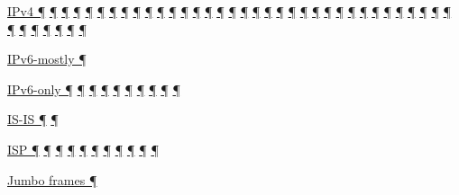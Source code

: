 \documentclass[
]{article}
\begin{document}
\hyperref[how-a-network-operations-center-sees-ipv6]{IPv4 ¶}
\hyperref[how-an-application-programmer-sees-ipv6]{¶}
\hyperref[why-ipv6-is-so-complicated]{¶} \hyperref[why-version-6]{¶}
\hyperref[address-resolution]{¶} \hyperref[addresses]{¶}
\hyperref[dns]{¶} \hyperref[extension-headers-and-options]{¶}
\hyperref[layer-2-functions]{¶} \hyperref[managed-configuration]{¶}
\hyperref[routing]{¶}
\hyperref[source-and-destination-address-selection]{¶}
\hyperref[traffic-class-and-flow-label]{¶}
\hyperref[transport-protocols]{¶}
\hyperref[coexistence-with-legacy-ipv4]{¶}
\hyperref[dual-stack-scenarios]{¶}
\hyperref[ipv6-primary-differences-from-ipv4]{¶}
\hyperref[obsolete-techniques]{¶}
\hyperref[translation-and-ipv4-as-a-service]{¶} \hyperref[tunnels]{¶}
\hyperref[security]{¶} \hyperref[filtering]{¶}
\hyperref[layer-2-considerations]{¶} \hyperref[topology-obfuscation]{¶}
\hyperref[network-design]{¶} \hyperref[address-planning]{¶}
\hyperref[address-and-prefix-management]{¶}
\hyperref[benchmarking-and-monitoring]{¶}
\hyperref[energy-consumption]{¶} \hyperref[multi-prefix-operation]{¶}
\hyperref[multihoming]{¶} \hyperref[packet-size-and-jumbo-frames]{¶}
\hyperref[routing-operation]{¶} \hyperref[cern-and-the-lhc]{¶}
\hyperref[deployment-by-carriers]{¶}
\hyperref[deployment-in-the-home]{¶} \hyperref[status]{¶}
\hyperref[troubleshooting]{¶} \hyperref[advanced-troubleshooting]{¶}
\hyperref[tools]{¶} \hyperref[obsolete-features-in-ipv6]{¶}
\hyperref[further-reading]{¶}

\hyperref[dual-stack-scenarios]{IPv6-mostly ¶}

\hyperref[routing]{IPv6-only ¶}
\hyperref[source-and-destination-address-selection]{¶}
\hyperref[coexistence-with-legacy-ipv4]{¶}
\hyperref[dual-stack-scenarios]{¶}
\hyperref[translation-and-ipv4-as-a-service]{¶} \hyperref[tunnels]{¶}
\hyperref[security]{¶} \hyperref[cern-and-the-lhc]{¶}
\hyperref[deployment-by-carriers]{¶}
\hyperref[advanced-troubleshooting]{¶}

\hyperref[routing]{IS-IS ¶} \hyperref[routing-operation]{¶}

\hyperref[addresses]{ISP ¶} \hyperref[routing]{¶}
\hyperref[dual-stack-scenarios]{¶}
\hyperref[translation-and-ipv4-as-a-service]{¶} \hyperref[tunnels]{¶}
\hyperref[address-planning]{¶}
\hyperref[address-and-prefix-management]{¶}
\hyperref[multi-prefix-operation]{¶} \hyperref[multihoming]{¶}
\hyperref[deployment-in-the-enterprise]{¶}
\hyperref[deployment-in-the-home]{¶}

\hyperref[packet-size-and-jumbo-frames]{Jumbo frames ¶}
\end{document}
